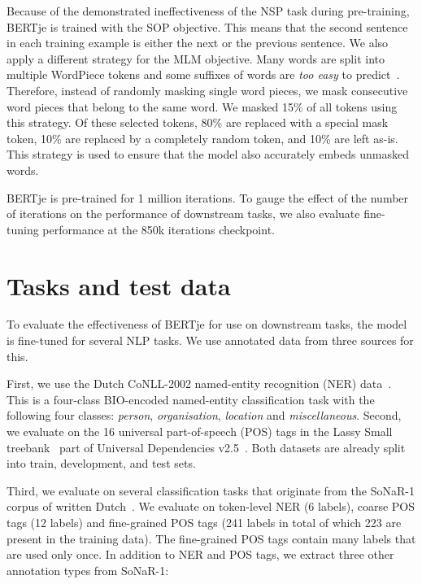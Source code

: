 \documentclass[11pt]{article}
\begin{document}
Because of the demonstrated ineffectiveness of the NSP task during pre-training, BERTje is trained with the SOP objective.
This means that the second sentence in each training example is either the next or the previous sentence. We also apply a different strategy for the MLM objective.
Many words are split into multiple WordPiece tokens and some suffixes of words are \textit{too easy} to predict~\citep{lan2019albert}.
Therefore, instead of randomly masking single word pieces, we mask consecutive word pieces that belong to the same word.
We masked 15\% of all tokens using this strategy.
Of these selected tokens, 80\% are replaced with a special mask token,
10\% are replaced by a completely random token,
and 10\% are left as-is.
This strategy is used to ensure that the model also accurately embeds unmasked words.

BERTje is pre-trained for 1 million iterations.
To gauge the effect of the number of iterations on the performance
of downstream tasks,
we also evaluate fine-tuning performance at the 850k iterations checkpoint.

\section{Tasks and test data}
To evaluate the effectiveness of BERTje for use on downstream tasks, the model is fine-tuned for several NLP tasks.
We use annotated data from three sources for this.

First, we use the Dutch CoNLL-2002 named-entity recognition (NER) data~\citep{tjong2002conll}.
This is a four-class BIO-encoded named-entity classification task with the following four classes: \textit{person}, \textit{organisation}, \textit{location} and \textit{miscellaneous}.
Second, we evaluate on the 16 universal part-of-speech (POS) tags in the Lassy Small treebank~\citep{lassy} part of Universal Dependencies v2.5~\citep{ud25}.
Both datasets are already split into train, development, and test sets.

Third, we evaluate on several classification tasks that originate from the SoNaR-1 corpus of written Dutch~\citep{sonar1}. We evaluate on token-level NER (6 labels), coarse POS tags (12 labels) and fine-grained POS tags (241 labels in total of which 223 are present in the training data). The fine-grained POS tags contain many labels that are used only once. In addition to NER and POS tags, we extract three other annotation types from SoNaR-1:
\end{document}

